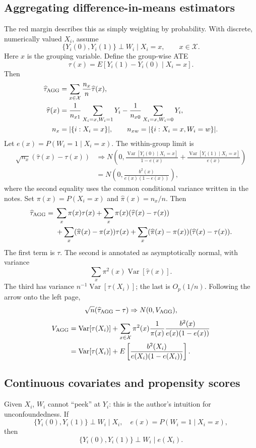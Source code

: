 \subsection{Aggregating difference-in-means estimators}
The red margin describes this as simply weighting by probability. With discrete, numerically valued $X_i$, assume
\[
\{Y_i(0),Y_i(1)\}\perp W_i\mid X_i=x,\qquad x\in\mathcal X.
\]
Here $x$ is the grouping variable. Define the group-wise ATE
\[
\tau(x)=E[Y_i(1)-Y_i(0)\mid X_i=x].
\]
Then
\begin{align*}
\widehat\tau_{\rm AGG}&=\sum_{x\in\mathcal X}\frac{n_x}{n}\widehat\tau(x),\\
\widehat\tau(x)&=\frac1{n_{x1}}\sum_{X_i=x,W_i=1}Y_i
-\frac1{n_{x0}}\sum_{X_i=x,W_i=0}Y_i,\\
n_x&=|\{i:X_i=x\}|,\qquad
n_{xw}=|\{i:X_i=x,W_i=w\}|.
\end{align*}
Let $e(x)=P(W_i=1\mid X_i=x)$. The within-group limit is
\begin{align*}
\sqrt{n_x}(\widehat\tau(x)-\tau(x))
&\Rightarrow N\left(0,
\frac{\operatorname{Var}[Y_i(0)\mid X_i=x]}{1-e(x)}
+\frac{\operatorname{Var}[Y_i(1)\mid X_i=x]}{e(x)}\right)\\
&=N\left(0,\frac{b^2(x)}{e(x)(1-e(x))}\right),
\end{align*}
where the second equality uses the common conditional variance written in the notes. Set $\pi(x)=P(X_i=x)$ and $\widehat\pi(x)=n_x/n$. Then
\begin{align*}
\widehat\tau_{\rm AGG}={}&\sum_x\pi(x)\tau(x)
+\sum_x\pi(x)(\widehat\tau(x)-\tau(x))\\
&+\sum_x(\widehat\pi(x)-\pi(x))\tau(x)
+\sum_x(\widehat\pi(x)-\pi(x))(\widehat\tau(x)-\tau(x)).
\end{align*}
The first term is $\tau$. The second is annotated as asymptotically normal, with variance
\[
\sum_x\pi^2(x)\operatorname{Var}[\widehat\tau(x)].
\]
The third has variance $n^{-1}\operatorname{Var}[\tau(X_i)]$; the last is $O_p(1/n)$. Following the arrow onto the left page,
\[
\sqrt n(\widehat\tau_{\rm AGG}-\tau)\Rightarrow N(0,V_{\rm AGG}),
\]
\begin{align*}
V_{\rm AGG}&=\operatorname{Var}[\tau(X_i)]
+\sum_{x\in\mathcal X}\pi^2(x)\frac1{\pi(x)}
\frac{b^2(x)}{e(x)(1-e(x))}\\
&=\operatorname{Var}[\tau(X_i)]
+E\left[\frac{b^2(X_i)}{e(X_i)(1-e(X_i))}\right].
\end{align*}
\subsection{Continuous covariates and propensity scores}
Given $X_i$, $W_i$ cannot ``peek'' at $Y_i$: this is the author's intuition for unconfoundedness. If
\[
\{Y_i(0),Y_i(1)\}\perp W_i\mid X_i,
\quad e(x)=P(W_i=1\mid X_i=x),
\]
then
\[
\{Y_i(0),Y_i(1)\}\perp W_i\mid e(X_i).
\]
